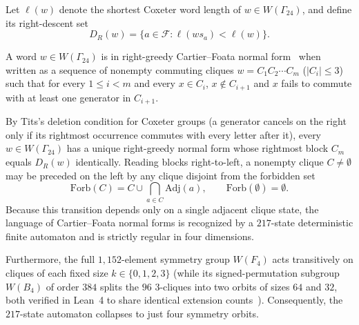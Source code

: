 Let $\ell(w)$ denote the shortest Coxeter word length of $w \in W(\Gamma_{24})$, and define its right-descent set
\begin{equation}
\label{eq:right-descent}
D_R(w) = \bigl\{a \in \mathcal{F} : \ell(w s_a) < \ell(w)\bigr\}.
\end{equation}
\begin{definition}
\label{def:foata}
A word $w \in W(\Gamma_{24})$ is in right-greedy Cartier--Foata normal form~\cite{cartier1969} when written as a sequence of nonempty commuting cliques $w = C_1 C_2 \cdots C_m$ ($|C_i| \le 3$) such that for every $1 \le i < m$ and every $x \in C_i$, $x \notin C_{i+1}$ and $x$ fails to commute with at least one generator in $C_{i+1}$.
\end{definition}

By Tits's deletion condition for Coxeter groups (a generator cancels on the right only if its rightmost occurrence commutes with every letter after it), every $w \in W(\Gamma_{24})$ has a unique right-greedy normal form whose rightmost block $C_m$ equals $D_R(w)$ identically. Reading blocks right-to-left, a nonempty clique $C \neq \emptyset$ may be preceded on the left by any clique disjoint from the forbidden set
\begin{equation}
\label{eq:forb-set}
\mathrm{Forb}(C) = C \cup \bigcap_{a \in C} \mathrm{Adj}(a), \qquad \mathrm{Forb}(\emptyset) = \emptyset.
\end{equation}
Because this transition depends only on a single adjacent clique state, the language of Cartier--Foata normal forms is recognized by a $217$-state deterministic finite automaton and is strictly regular in four dimensions.

Furthermore, the full $1{,}152$-element symmetry group $W(F_4)$ acts transitively on cliques of each fixed size $k \in \{0,1,2,3\}$ (while its signed-permutation subgroup $W(B_4)$ of order $384$ splits the $96$ $3$-cliques into two orbits of sizes $64$ and $32$, both verified in Lean~4 to share identical extension counts~\cite{pollard2026repo}). Consequently, the $217$-state automaton collapses to just four symmetry orbits.

